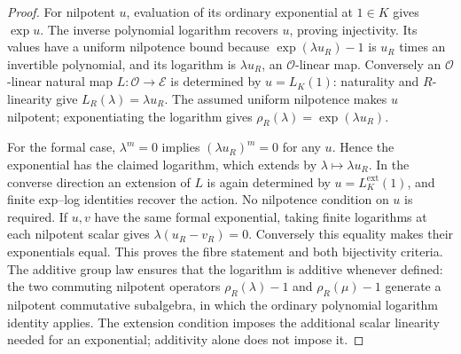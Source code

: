 \begin{proof}
For nilpotent $u$, evaluation of its ordinary exponential at
$1\in K$ gives $\exp u$. The inverse polynomial logarithm recovers $u$,
proving injectivity. Its values have a uniform nilpotence bound because
$\exp(\lambda u_R)-1$ is $u_R$ times an invertible polynomial, and
its logarithm is $\lambda u_R$, an $\mathcal O$-linear map.
Conversely an $\mathcal O$-linear natural map
$L:\mathcal O\to\mathscr E$ is determined by $u=L_K(1)$: naturality and
$R$-linearity give $L_R(\lambda)=\lambda u_R$. The assumed uniform
nilpotence makes $u$ nilpotent; exponentiating the logarithm gives
$\rho_R(\lambda)=\exp(\lambda u_R)$.

For the formal case, $\lambda^m=0$ implies $(\lambda u_R)^m=0$ for any
$u$. Hence the exponential has the claimed logarithm, which extends by
$\lambda\mapsto\lambda u_R$. In the converse direction an extension of
$L$ is again determined by $u=L_K^{\mathrm{ext}}(1)$, and finite exp--log
identities recover the action. No nilpotence condition on $u$ is required.
If $u,v$ have the same formal exponential, taking finite logarithms at
each nilpotent scalar gives $\lambda(u_R-v_R)=0$. Conversely this equality
makes their exponentials equal. This proves the fibre statement and both
bijectivity criteria. The additive group law ensures that the logarithm
is additive whenever defined: the two commuting nilpotent operators
$\rho_R(\lambda)-1$ and $\rho_R(\mu)-1$ generate a nilpotent commutative
subalgebra, in which the ordinary polynomial logarithm identity applies.
The extension condition imposes the additional scalar linearity needed
for an exponential; additivity alone does not impose it.
\end{proof}

